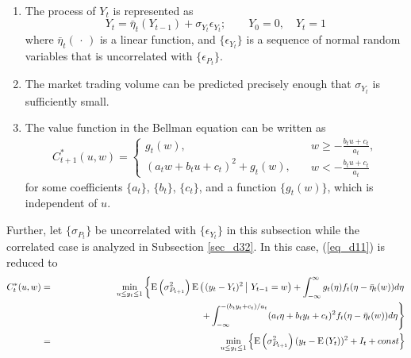 \begin{assumption}\label{ass_d4}
\quad \\
\vspace*{-7mm}
\begin{enumerate}
\item The process of $Y_t$ is represented as
\[ %
Y_t= \bar \eta_t(Y_{t-1})+\sigma_{Y_t}\epsilon_{Y_t}; \qquad Y_0=0, \quad Y_t=1
\] %
where $\bar \eta_t(\, \cdot\, )$ is a linear function, and $\{ \epsilon_{Y_t} \}$ is 
a sequence of normal random variables that is uncorrelated with 
$\{\epsilon_{P_t}\}$.
\item The market trading volume can be predicted precisely enough that 
$\sigma_{Y_t}$ is sufficiently small.
\item  The value function in the Bellman equation can be written as 
\[ %
  C_{t+1}^*(u, w) = \left\{
  \begin{array}{ll}
   g_t(w), \\
   (a_t w + b_t u + c_t)^2 + g_t(w), 
  \end{array}
  \right. \quad
  \begin{array}{ll}
    w \geq -\frac{b_tu+c_t}{a_t},\\
    w < -\frac{b_tu+c_t}{a_t}
  \end{array}
\] %
for some coefficients $\{ a_t \}$, $\{ b_t \}$, $\{ c_t \}$, and a function $\{ g_t(w) \}$, which is independent of $u$.
\end{enumerate}
\end{assumption}
Further, let $\{\sigma_{P_t}\}$ be uncorrelated with $\{\epsilon_{Y_t}\}$ in 
this subsection while the correlated case is analyzed in Subsection 
\ref{sec_d32}.  
 In this case, (\ref{eq_d11}) is reduced to
\begin{eqnarray*} %
  C_t^* (u, w)
  & = & \min_{u \leq y_t \leq 1} \left\{
        \ex{\sigma_{P_{t+1}}^2} \cex{(y_t-Y_t)^2}{Y_{t-1}=w}
        + \int_{-\infty}^\infty g_t (\eta) f_t(\eta - \bar \eta_t(w)) d \eta
        \right. \\
  &   & \hspace*{5.5cm} \left.
        + \int_{-\infty}^{-(b_t y_t + c_t)/a_t} (a_t \eta + b_t y_t + c_t )^2
        f_t(\eta - \bar \eta_t(w)) d \eta
        \right\} \\
  & = & \min_{u \leq y_t \leq 1} \left\{ \ex{\sigma_{P_{t+1}}^2} (y_t-\ex{Y_t})^2 + I_t + const \right\}
\end{eqnarray*}
